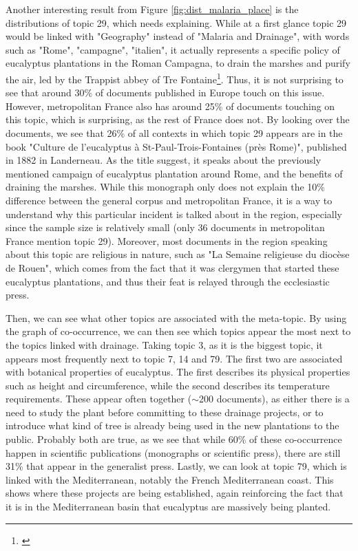 Another interesting result from Figure \ref{fig:dist_malaria_place} is the distributions of topic 29, which needs explaining. While at a first glance topic 29 would be linked with "Geography" instead of "Malaria and Drainage", with words such as "Rome", "campagne", "italien", it actually represents a specific policy of eucalyptus plantations in the Roman Campagna, to drain the marshes and purify the air, led by the Trappist abbey of Tre Fontaine\footnote{\cite{noauthor_eucalyptus_1883}}. Thus, it is not surprising to see that around 30\% of documents published in Europe touch on this issue. However, metropolitan France also has around 25\% of documents touching on this topic, which is surprising, as the rest of France does not. By looking over the documents, we see that 26\% of all contexts in which topic 29 appears are in the book "Culture de l'eucalyptus à St-Paul-Trois-Fontaines (près Rome)", published in 1882 in Landerneau. As the title suggest, it speaks about the previously mentioned campaign of eucalyptus plantation around Rome, and the benefits of draining the marshes. While this monograph only does not explain the 10\% difference between the general corpus and metropolitan France, it is a way to understand why this particular incident is talked about in the region, especially since the sample size is relatively small (only 36 documents in metropolitan France mention topic 29). Moreover, most documents in the region speaking about this topic are religious in nature, such as "La Semaine religieuse du diocèse de Rouen", which comes from the fact that it was clergymen that started these eucalyptus plantations, and thus their feat is relayed through the ecclesiastic press. 

Then, we can see what other topics are associated with the meta-topic. By using the graph of co-occurrence, we can then see which topics appear the most next to the topics linked with drainage. Taking topic 3, as it is the biggest topic, it appears most frequently next to topic 7, 14 and 79. The first two are associated with botanical properties of eucalyptus. The first describes its physical properties such as height and circumference, while the second describes its temperature requirements. These appear often together ($\sim$200 documents), as either there is a need to study the plant before committing to these drainage projects, or to introduce what kind of tree is already being used in the new plantations to the public. Probably both are true, as we see that while 60\% of these co-occurrence happen in scientific publications (monographs or scientific press), there are still 31\% that appear in the generalist press. Lastly, we can look at topic 79, which is linked with the Mediterranean, notably the French Mediterranean coast. This shows where these projects are being established, again reinforcing the fact that it is in the Mediterranean basin that eucalyptus are massively being planted. 

